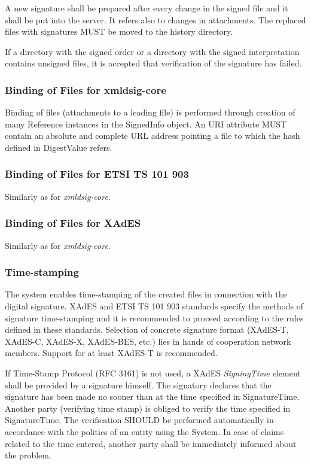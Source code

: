 \documentclass[a4paper]{article}
\begin{document}
A new signature shall be prepared after every change in the signed file and it shall be put 
into the server. It refers also to changes in attachments. The replaced files with signatures 
MUST be moved to the history directory.

If a directory with the signed order or a directory with the signed interpretation contains 
unsigned files, it is accepted that verification of the signature has failed.

\subsubsection{Binding of Files for xmldsig-core}

Binding of files (attachments to a leading file) is performed through creation of many 
Reference instances in the SignedInfo object. An URI attribute MUST contain an absolute and 
complete URL address pointing a file to which the hash defined in DigestValue refers.

\subsubsection{Binding of Files for ETSI TS 101 903}

Similarly as for \emph{xmldsig-core}.

\subsubsection{Binding of Files for XAdES}

Similarly as for \emph{xmldsig-core}.

\subsubsection{Time-stamping}

The system enables time-stamping of the created files in connection with the digital signature.
XAdES and ETSI TS 101 903 standards specify the methods of signature time-stamping and it 
is recommended to proceed according to the rules defined in these standards. Selection of
concrete signature format (XAdES-T, XAdES-C, XAdES-X, XAdES-BES, etc.) lies in hands of 
cooperation network members. Support for at least XAdES-T is recommended. 

If Time-Stamp Protocol (RFC 3161) is not used, a XAdES \emph{SigningTime} element 
shall be provided by a signature himself. The signatory 
declares that the signature has been made no sooner than at the time specified in SignatureTime. 
Another party (verifying time stamp) is obliged to verify the time specified in SignatureTime. 
The verification SHOULD be performed automatically in accordance with the politics of an 
entity using the System. In case of claims related to the time entered, another party shall 
be immediately informed about the problem.
\end{document}
